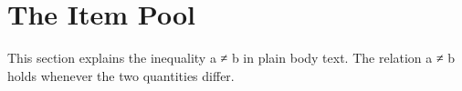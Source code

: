 \section{The Item Pool}

This section explains the inequality a ≠ b in plain body text.
The relation a ≠ b holds whenever the two quantities differ.
